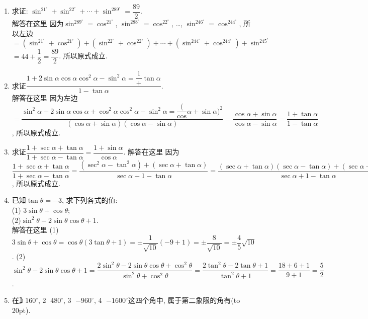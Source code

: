 \documentclass[10pt,a4paper]{article}
\newcommand{\bracket}[1]{(\hbox to #1pt{})}
\begin{document}
\begin{enumerate}[1.]
$=\dfrac{\tan \alpha}{\tan \alpha -\tan \beta}$, 左边$=$右边, 所以原式成立.
\item 求证: $\sin ^21^\circ +\sin ^22^\circ +\cdots +\sin ^289^\circ =\dfrac{89}2$.\\
解答在这里  因为$ \sin ^289^\circ =\cos ^21^\circ$, $\sin ^288^\circ =\cos ^22^\circ$, …, $\sin ^246^\circ =\cos ^244^\circ$,
所以左边$=(\sin ^21^\circ +\cos ^21^\circ)+(\sin ^22^\circ +\cos ^22^\circ)+\cdots +(\sin ^244^\circ +\cos ^244^\circ)+\sin ^245^\circ$
$=44+\dfrac 12=\dfrac{89}2$. 所以原式成立.
\item 求证$\dfrac{1+2\sin \alpha \cos \alpha \cos ^2\alpha -\sin ^2\alpha =\dfrac 1+\tan \alpha}{1-\tan \alpha}$.\\
解答在这里 因为左边$=\dfrac{\sin ^2\alpha +2\sin \alpha \cos \alpha +\cos ^2\alpha \cos ^2\alpha -\sin ^2\alpha =\dfrac (\cos \alpha +\sin \alpha)^2}{(\cos \alpha +\sin \alpha)(\cos \alpha -\sin \alpha)}=\dfrac{\cos \alpha +\sin \alpha}{\cos \alpha -\sin \alpha}=\dfrac{1+\tan \alpha}{1-\tan \alpha}$, 所以原式成立.
\item 求证$\dfrac{1+\sec \alpha +\tan \alpha}{1+\sec \alpha -\tan \alpha}=\dfrac{1+\sin \alpha}{\cos \alpha}$.
解答在这里 因为$ \dfrac{1+\sec \alpha +\tan \alpha}{1+\sec \alpha -\tan \alpha}=\dfrac{(\sec ^2\alpha -\tan ^2\alpha)+(\sec \alpha +\tan \alpha)}{\sec \alpha +1-\tan \alpha}=\dfrac{(\sec \alpha +\tan \alpha)(\sec \alpha -\tan \alpha)+(\sec \alpha +\tan \alpha)}{\sec \alpha +1-\tan \alpha}=\dfrac{(\sec \alpha +\tan \alpha)(\sec \alpha -\tan \alpha +1)}{\sec \alpha +1-\tan \alpha}=\sec \alpha +\tan \alpha =\dfrac 1{\cos \alpha}+\dfrac{\sin \alpha}{\cos \alpha}=\dfrac{1+\sin \alpha}{\cos \alpha}$, 所以原式成立.
\item 已知$\tan \theta =-3$, 求下列各式的值:\\
(1) $3\sin \theta +\cos \theta$;\\
(2)$\sin ^2\theta -2\sin \theta \cos \theta +1$.\\
解答在这里  (1)$3\sin \theta +\cos \theta =\cos \theta (3\tan \theta +1)=\pm \dfrac 1{\sqrt {10}}(-9+1)=\pm \dfrac 8{\sqrt {10}}=\pm \dfrac 45\sqrt {10}$.
(2)$\sin ^2\theta -2\sin \theta \cos \theta +1=\dfrac{2\sin ^2\theta -2\sin \theta \cos \theta +\cos ^2\theta}{\sin ^2\theta +\cos ^2\theta}=\dfrac{2\tan ^2\theta -2\tan \theta +1}{\tan ^2\theta +1}=\dfrac{18+6+1}{9+1}=\dfrac 52$.
\item 在\textcircled{1} $160^\circ$, \textcircled{2} $480^\circ$, \textcircled{3} $-960^\circ$, \textcircled{4} $-1600^\circ$这四个角中, 属于第二象限的角有\bracket{20}.

\end{enumerate}
\end{document}
